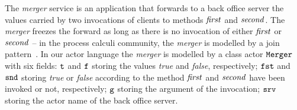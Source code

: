 \documentclass{LMCS}
\theoremstyle{plain}\newtheorem{proposition}[thm]{Proposition}
\theoremstyle{plain}\newtheorem{lemma}[thm]{Lemma}
\theoremstyle{plain}\newtheorem{theorem}[thm]{Theorem}
\theoremstyle{plain}\newtheorem{corollary}[thm]{Corollary}
\newcommand{\adef}[1]{{\tt #1}}
\begin{document}
\begin{exa}
The \emph{merger} service is an application that forwards 
to a back office server the values carried by two invocations of 
clients to methods ${\it first}$ and ${\it second}$. The \emph{merger}
freezes the forward as long as there is no invocation of either  
${\it first}$ or ${\it second}$ -- in the process calculi community,
the \emph{merger} is modelled by a join pattern~\cite{FG96}.
In our actor language the \emph{merger} is modelled by a class actor
$\adef{Merger}$ with six fields: ${\tt t}$ and ${\tt f}$ storing the  values \emph{true} and \emph{false}, respectively; ${\tt fst}$ and ${\tt snd}$
storing \emph{true} or \emph{false} according to the method 
${\it first}$ and ${\it second}$ have been invoked or not, respectively;
${\tt g}$ storing the  argument of the invocation; ${\tt srv}$ storing the
actor name of the back office server.


\end{exa}
\end{document}
